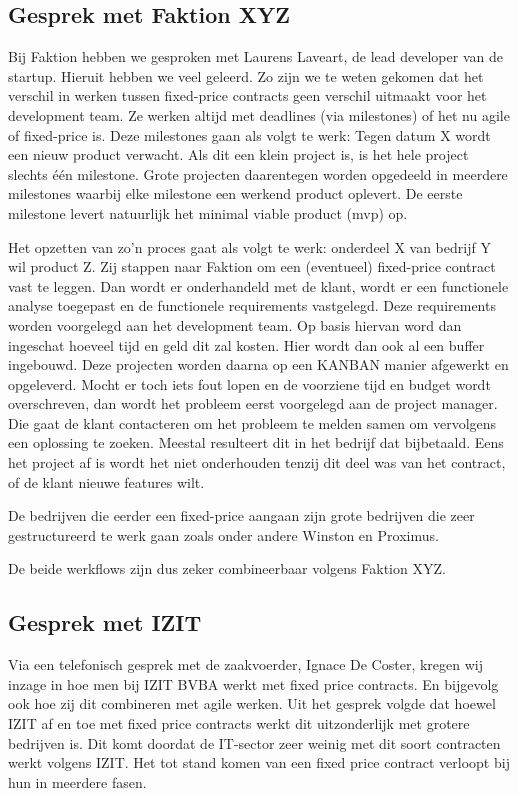 \documentclass{hogent-article}
\begin{document}
    \subsection{Gesprek met Faktion XYZ}
    Bij Faktion hebben we gesproken met Laurens Laveart, de lead developer van de startup. Hieruit hebben we veel geleerd. Zo zijn we te weten gekomen dat het verschil in werken tussen fixed-price contracts geen verschil uitmaakt voor het development team. Ze werken altijd met deadlines (via milestones) of het nu agile of fixed-price is. Deze milestones gaan als volgt te werk: Tegen datum X wordt een nieuw product verwacht. Als dit een klein project is, is het hele project slechts één milestone. Grote projecten daarentegen worden opgedeeld in meerdere milestones waarbij elke milestone een werkend product oplevert. De eerste milestone levert natuurlijk het minimal viable product (mvp) op.
    
    Het opzetten van zo'n proces gaat als volgt te werk: onderdeel X van bedrijf Y wil product Z. Zij stappen naar Faktion om een (eventueel) fixed-price contract vast te leggen. Dan wordt er onderhandeld met de klant, wordt er een functionele analyse toegepast en de functionele requirements vastgelegd. Deze requirements worden voorgelegd aan het development team. Op basis hiervan word dan ingeschat hoeveel tijd en geld dit zal kosten. Hier wordt dan ook al een buffer ingebouwd. Deze projecten worden daarna op een KANBAN manier afgewerkt en opgeleverd. Mocht er toch iets fout lopen en de voorziene tijd en budget wordt overschreven, dan wordt het probleem eerst voorgelegd aan de project manager. Die gaat de klant contacteren om het probleem te melden samen om vervolgens een oplossing te zoeken. Meestal resulteert dit in het bedrijf dat bijbetaald. Eens het project af is wordt het niet onderhouden tenzij dit deel was van het contract, of de klant nieuwe features wilt.
    
    De bedrijven die eerder een fixed-price aangaan zijn grote bedrijven die zeer gestructureerd te werk gaan zoals onder andere Winston en Proximus.
    
    De beide werkflows zijn dus zeker combineerbaar volgens Faktion XYZ.
    
    \subsection{Gesprek met IZIT}
    Via een telefonisch gesprek met de zaakvoerder, Ignace De Coster, kregen wij inzage in hoe men bij IZIT BVBA werkt met fixed price contracts. En bijgevolg ook hoe zij dit combineren met agile werken. Uit het gesprek volgde dat hoewel IZIT af en toe met fixed price contracts werkt dit uitzonderlijk met grotere bedrijven is. Dit komt doordat de IT-sector zeer weinig met dit soort contracten werkt volgens IZIT. Het tot stand komen van een fixed price contract verloopt bij hun in meerdere fasen.
    
\end{document}
